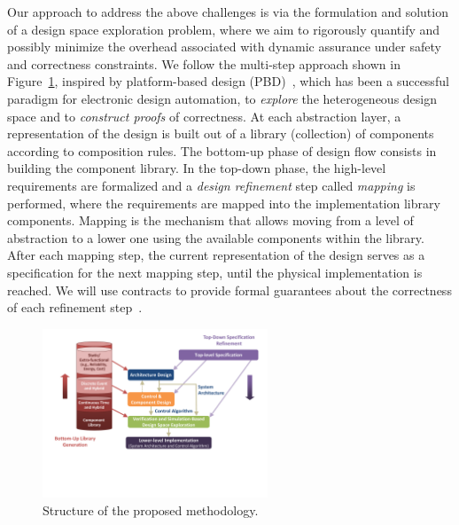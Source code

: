 Our approach to address the above challenges is via the formulation and solution of a design space exploration problem, where we aim to rigorously quantify and possibly minimize the overhead associated with dynamic assurance under safety and correctness constraints. We follow the multi-step approach shown in Figure~\ref{fig:methodology}, inspired by platform-based design (PBD)~\cite{ASV:ortho}, which has been a successful paradigm for electronic design automation, to \emph{explore} the heterogeneous design space and to \emph{construct proofs} of correctness.  %
At each abstraction layer, a representation of the design is built out of a library
(collection) of components according to composition rules. The bottom-up phase of design flow consists in building the component library. In the top-down phase, the high-level requirements are formalized and a \emph{design refinement} step called \emph{mapping} is performed, where the requirements are mapped into the implementation library components. Mapping is 
the mechanism that allows moving from a level of abstraction to a lower one
using the available components within the library. 
After each mapping step, the current representation of the design serves
as a specification for the next mapping step, until the physical implementation
is reached. We will use  contracts to provide formal guarantees about the correctness of each refinement step~\cite{Nuzzo15b}.

\begin{figure}
\vspace{-30pt}
\begin{center}
\includegraphics[width=0.6\textwidth,trim={0in 0.15in 0in 0in},clip]{./TA1/structure.pdf}
\vspace{-60pt}
\caption{Structure of the proposed methodology.}
\label{fig:methodology}
\end{center}
\vspace{-25pt}
\end{figure}

